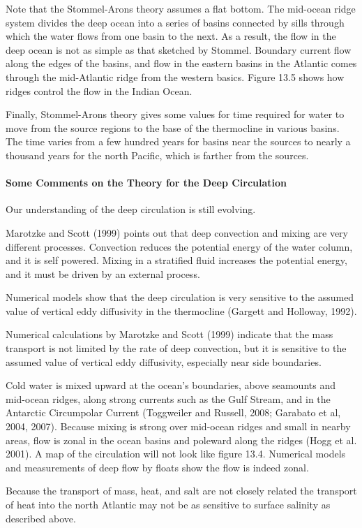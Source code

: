 Note that the Stommel-Arons theory assumes a flat bottom. The
mid-ocean ridge system divides the deep ocean into a series of basins
connected by sills through which the water flows from one basin to the
next. As a result, the flow in the deep ocean is not as simple as that
sketched by Stommel. Boundary current flow along the edges of the
basins, and flow in the eastern basins in the Atlantic comes through
the mid-Atlantic ridge from the western basics. Figure 13.5 shows how
ridges control the flow in the Indian Ocean.

Finally, Stommel-Arons theory gives some values for time required for
water to move from the source regions to the base of the
thermocline in various basins. The time varies from
a few hundred years for basins near the sources to nearly a thousand
years for the north Pacific, which is farther from the
sources.

\paragraph{Some Comments on the Theory for the Deep Circulation} Our understanding of the deep circulation is still evolving.
\begin{enumerate}
\vitem Marotzke and Scott (1999) points out that deep convection and
mixing are very different
processes. Convection reduces the potential energy of the water
column, and it is self powered. Mixing in a stratified fluid increases
the potential energy, and it must be driven by an external process.

\vitem Numerical models show that the deep circulation is very
sensitive to the assumed value of vertical eddy diffusivity in the
thermocline (Gargett and
Holloway, 1992).

\vitem Numerical calculations by Marotzke and Scott (1999) indicate
that the mass transport is not limited by the
rate of deep convection, but it is sensitive to the assumed value of
vertical eddy diffusivity, especially near side boundaries.

\vitem Cold water is mixed upward at the ocean's boundaries, above
seamounts and mid-ocean ridges, along
strong currents such as the Gulf Stream, and in the Antarctic Circumpolar Current (Toggweiler and
Russell, 2008; Garabato et al, 2004, 2007). Because mixing is strong
over mid-ocean ridges and small in nearby areas, flow is zonal in the
ocean basins and poleward along the ridges (Hogg et al. 2001). A map
of the circulation will not look like figure 13.4. Numerical
models and measurements of
deep flow by floats show the flow is indeed zonal.

\vitem Because the transport of mass, heat, and salt are not closely
related the transport of heat into the north Atlantic may not be as
sensitive to surface salinity as described above.
\end{enumerate}

